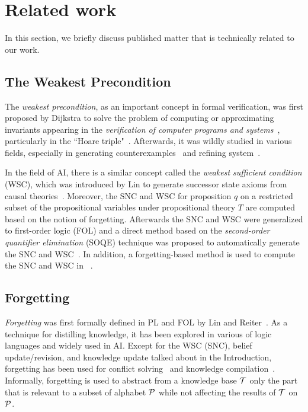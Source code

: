\documentclass[runningheads]{llncs}
\begin{document}
\section{Related work}
In this section, we briefly discuss published matter that is technically related to our work.

\subsection{The Weakest Precondition}


The \emph{weakest precondition}, as an important concept in formal verification, was first proposed %
by Dijkstra to solve the problem of computing or approximating invariants appearing in the  \emph{verification of computer programs and systems}~\cite{DBLP:journals/cacm/Dijkstra75}, particularly in the ``Hoare triple"~\cite{Hoare1969}.
Afterwards, it was wildly studied in various fields, especially in generating counterexamples~\cite{dailler2018instrumenting} and refining system~\cite{woodcock1990refinement}.

In the field of AI, there is a similar concept called the \emph{weakest sufficient condition} (WSC), which was introduced by Lin to generate successor state axioms from causal theories~\cite{DBLP:Lin:AIJ:2001}. Moreover, the SNC and WSC for proposition $q$ on a restricted subset of the propositional variables under propositional theory $T$ are computed based on the notion of forgetting.
Afterwards the SNC and WSC were generalized to first-order logic (FOL) and a direct method based
on the \emph{second-order quantifier elimination} (SOQE) technique was proposed to automatically generate the SNC and WSC~\cite{doherty2001computing}. In addition, a forgetting-based method is used to compute the SNC and WSC in \CTL~\cite{renyansfirstpaper}.

\subsection{Forgetting}
\emph{Forgetting}
was first formally defined in PL and FOL by Lin and Reiter~\cite{lin1994forget,eiter2019brief}.
As a technique for distilling knowledge, it has been explored in various of logic languages and widely used in AI. %
Except for the WSC (SNC), belief update/revision, and knowledge update talked about in the Introduction, forgetting has been used for conflict solving~\cite{DBLP:Zhang:AIJ2006,Lang2010Reasoning} and knowledge compilation~\cite{Bienvenu2010Knowledge}.
Informally, forgetting is used to abstract from a knowledge base ${\cal T}$ only the part that is relevant to a subset of alphabet ${\cal P}$ while not affecting the results of ${\cal T}$ on ${\cal P}$.
\end{document}
